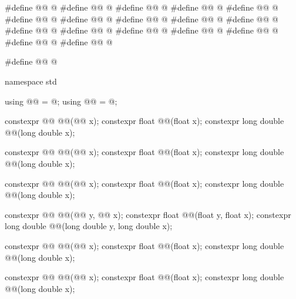 %
\begin{codeblock}
#define @@ @\seebelow@
#define @@ @\seebelow@
#define @@ @\seebelow@
#define @@ @\seebelow@
#define @@ @\seebelow@
#define @@ @\seebelow@
#define @@ @\seebelow@
#define @@ @\seebelow@
#define @@ @\seebelow@
#define @@ @\seebelow@
#define @@ @\seebelow@
#define @@ @\seebelow@
#define @@ @\seebelow@
#define @@ @\seebelow@
#define @@ @\seebelow@
#define @@ @\seebelow@
#define @@ @\seebelow@

#define @@ @\seebelow@

namespace std {
  using @@ = @\seebelow@;
  using @@ = @\seebelow@;

  constexpr @@ @@(@@ x);
  constexpr float               @@(float x);
  constexpr long double         @@(long double x);

  constexpr @@ @@(@@ x);
  constexpr float               @@(float x);
  constexpr long double         @@(long double x);

  constexpr @@ @@(@@ x);
  constexpr float               @@(float x);
  constexpr long double         @@(long double x);

  constexpr @@ @@(@@ y, @@ x);
  constexpr float               @@(float y, float x);
  constexpr long double         @@(long double y, long double x);

  constexpr @@ @@(@@ x);
  constexpr float               @@(float x);
  constexpr long double         @@(long double x);

  constexpr @@ @@(@@ x);
  constexpr float               @@(float x);
  constexpr long double         @@(long double x);

}
\end{codeblock}
